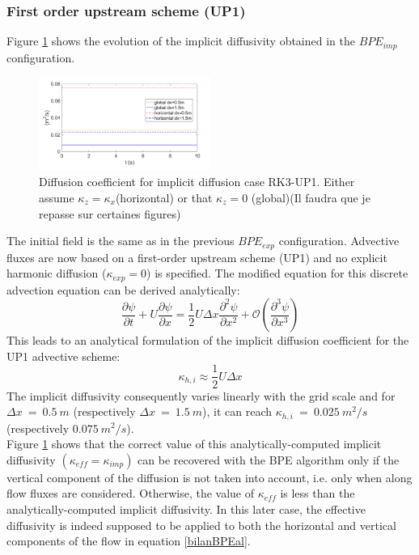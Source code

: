 \subsubsection{First order upstream scheme (UP1)}
Figure \ref{fig3numlab} shows the evolution of the implicit diffusivity obtained in the $BPE_{imp}$ configuration.
\begin{figure}[h!]
\centering
\includegraphics[width=0.5\textwidth]{./CHAP_BPE/AGBPE_numlab3.png}
\caption{Diffusion coefficient for implicit diffusion case RK3-UP1. Either assume $\kappa_z=\kappa_x$(horizontal) or that $\kappa_z=0$ (global)\color{red}(Il faudra que je repasse sur certaines figures)\color{black}}
\label{fig3numlab}
\end{figure}
The initial field is the same as in the previous $BPE_{exp}$ configuration. Advective fluxes are now based on a first-order upstream scheme (UP1) and no explicit harmonic diffusion ($\kappa_{exp}=0$) is specified.
The modified equation for this discrete advection equation can be derived analytically:
\begin{equation}
\frac{\partial \psi}{\partial t}+U \frac{\partial \psi}{\partial x} = \frac{1}{2} U \Delta x  \frac{\partial^2 \psi}{\partial x^2} + \mathcal{O}(\frac{\partial^3 \psi}{\partial x^3})
\end{equation}
This leads to an analytical formulation of the implicit diffusion coefficient for the UP1 advective scheme: 
\begin{equation}
    \displaystyle
    \kappa_{h,i}\approx\frac{1}{2}U \Delta x
\end{equation}
The implicit diffusivity consequently varies linearly with the grid scale and for $\Delta x\ =\ 0.5\ m$ (respectively $\Delta x\ =\ 1.5\ m$), it can reach $\kappa_{h,i}\ =\ 0.025\ m^2/s$  (respectively $0.075\ m^2/s$).\\
Figure \ref{fig3numlab} shows that the correct value of this analytically-computed implicit diffusivity $(\kappa_{eff}=\kappa_{imp})$ can be recovered with the BPE algorithm only if the vertical component of the diffusion is not taken into account, i.e. only when along flow fluxes are considered. Otherwise, the value of $\kappa_{eff}$ is less than the analytically-computed implicit diffusivity. In this later case, the effective diffusivity is indeed supposed to be applied to both the horizontal and vertical components of the flow in equation \ref{bilanBPEal}.

